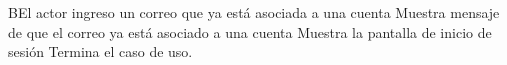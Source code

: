 		\begin{UCtrayectoriaA}{B}{El actor ingreso un correo que ya está asociada a una cuenta}
			\UCpaso Muestra mensaje de que el correo ya está asociado a una cuenta
			\UCpaso Muestra la pantalla de inicio de sesión
            \UCpaso[] Termina el caso de uso.
		\end{UCtrayectoriaA}
		


		
		
		
